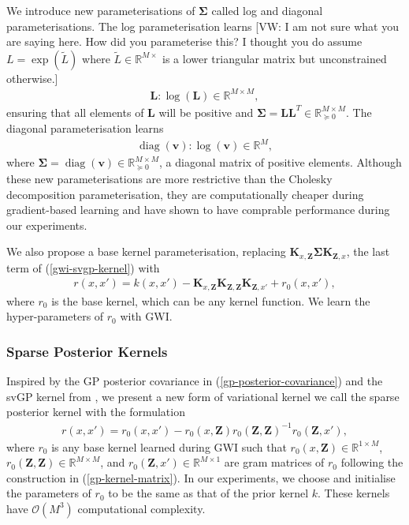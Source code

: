 \documentclass{article}
\newcommand{\vw}[1]{{\color{green} [VW: #1]}}
\newcommand{\bbR}{\mathbb{R}}
\newcommand{\diag}{\operatorname{diag}}
\numberwithin{equation}{section}
\begin{document}
We introduce new parameterisations of $\mathbf{\Sigma}$ called log and diagonal parameterisations. The log parameterisation learns \vw{I am not sure what you are saying here. How did you parameterise this? I thought you do assume $L = \exp(\widetilde{L})$ where $\widetilde{L} \in \bbR^{M \times}$ is a lower triangular matrix but unconstrained otherwise.}
\begin{align}
    \mathbf{L}: \log\left(\mathbf{L}\right) \in \mathbb{R}^{M \times M},
\end{align}
ensuring that all elements of $\mathbf{L}$ will be positive and $\mathbf{\Sigma} = \mathbf{L}\mathbf{L}^T \in \mathbb{R}^{M \times M}_{\succcurlyeq 0}$. The diagonal parameterisation learns
\begin{align}
    \diag(\mathbf{v}): \log(\mathbf{v}) \in \mathbb{R}^M,
\end{align}
where $\mathbf{\Sigma} = \diag(\mathbf{v}) \in \mathbb{R}^{M \times M}_{\succcurlyeq 0}$, a diagonal matrix of positive elements. Although these new parameterisations are more restrictive than the Cholesky decomposition parameterisation, they are computationally cheaper during gradient-based learning and have shown to have comprable performance during our experiments.

We also propose a base kernel parameterisation, replacing $\mathbf{K}_{x, \mathbf{Z}} \mathbf{\Sigma} \mathbf{K}_{\mathbf{Z}, x}$, the last term of (\ref{gwi-svgp-kernel}) with
\begin{align}
    r(x, x') = k(x, x') - \mathbf{K}_{x, \mathbf{Z}} \mathbf{K}_{\mathbf{Z}, \mathbf{Z}} \mathbf{K}_{\mathbf{Z}, x'} + r_0(x, x'),
    \label{gwi-svgp-kernel}
\end{align}
where $r_0$ is the base kernel, which can be any kernel function. We learn the hyper-parameters of $r_0$ with GWI.

\subsubsection{Sparse Posterior Kernels}
Inspired by the GP posterior covariance in (\ref{gp-posterior-covariance}) and the svGP kernel from \cite{titsias2009variational}, we present a new form of variational kernel we call the sparse posterior kernel with the formulation
\begin{align}
    r(x, x') = r_0(x, x') - r_0\left(x, \mathbf{Z}\right) r_0\left(\mathbf{Z}, \mathbf{Z}\right)^{-1} r_0\left(\mathbf{Z}, x'\right),
\end{align}
where $r_0$ is any base kernel learned during GWI such that $r_0\left(x, \mathbf{Z}\right) \in \mathbb{R}^{1 \times M}$, $r_0\left(\mathbf{Z}, \mathbf{Z}\right) \in \mathbb{R}^{M \times M}$, and $r_0\left(\mathbf{Z}, x'\right) \in \mathbb{R}^{M \times 1}$ are gram matrices of $r_0$ following the construction in (\ref{gp-kernel-matrix}).
In our experiments, we choose and initialise the parameters of $r_0$ to be the same as that of the prior kernel $k$.
These kernels have $\mathcal{O}(M^3)$ computational complexity.
\end{document}
